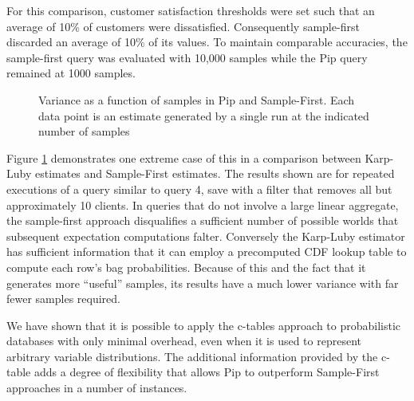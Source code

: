 For this comparison, customer satisfaction thresholds were set such that an average of 10\% of customers were dissatisfied.  Consequently sample-first discarded an average of 10\% of its values.  To maintain comparable accuracies, the sample-first query was evaluated with 10,000 samples while the Pip query remained at 1000 samples.  

\begin{figure}
\begin{center}
\caption{Variance as a function of samples in Pip and Sample-First.  Each data point is an estimate generated by a single run at the indicated number of samples}
\label{fig:iterativerefinement}
\end{center}
\end{figure}


Figure \ref{fig:iterativerefinement} demonstrates one extreme case of this in a comparison between Karp-Luby estimates and Sample-First estimates.  The results shown are for repeated executions of a query similar to query 4, save with a filter that removes all but approximately 10 clients.  In queries that do not involve a large linear aggregate, the sample-first approach disqualifies a sufficient number of possible worlds that subsequent expectation computations falter.  Conversely the Karp-Luby estimator has sufficient information that it can employ a precomputed CDF lookup table to compute each row's bag probabilities.  Because of this and the fact that it generates more ``useful'' samples, its results have a much lower variance with far fewer samples required.

We have shown that it is possible to apply the c-tables approach to probabilistic databases with only minimal overhead, even when it is used to represent arbitrary variable distributions.  The additional information provided by the c-table adds a degree of flexibility that allows Pip to outperform Sample-First approaches in a number of instances.


